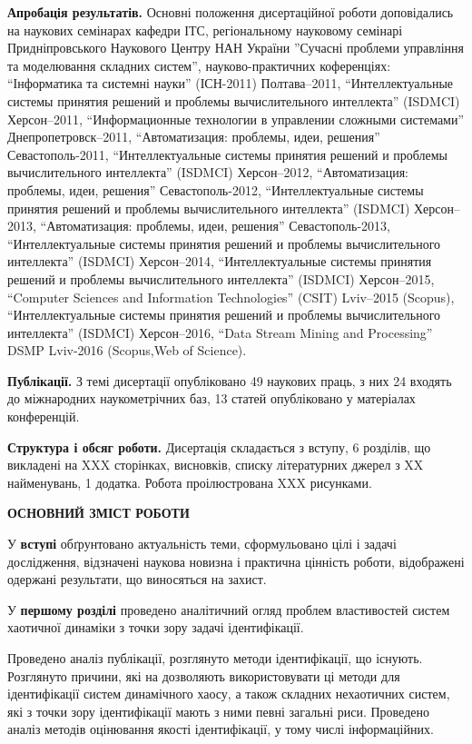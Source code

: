 \documentclass[a4paper,13pt]{atuaref}
\newcommand{\xsect}[1]{\medskip\begin{center}\textbf{#1}\end{center}\medskip\penalty10000}
\begin{document}
\smallskip
\textbf{Апробація результатів.}
Основні положення дисертаційної роботи доповідались на наукових
семінарах кафедри ІТС,
регіональному науковому семінарі Придніпровського Наукового Центру НАН України
''Сучасні проблеми управління та моделювання складних систем'',
науково-практичних коференціях:
``Інформатика та системні науки'' (ІСН-2011) Полтава--2011,
``Интеллектуальные системы принятия решений и проблемы вычислительного интеллекта'' (ISDMCI) Херсон--2011,
``Информационные технологии в управлении сложными системами'' Днепропетровск--2011,
``Автоматизация: проблемы, идеи, решения'' Севастополь-2011,
``Интеллектуальные системы принятия решений и проблемы вычислительного интеллекта'' (ISDMCI) Херсон--2012,
``Автоматизация: проблемы, идеи, решения'' Севастополь-2012,
``Интеллектуальные системы принятия решений и проблемы вычислительного интеллекта'' (ISDMCI) Херсон--2013,
``Автоматизация: проблемы, идеи, решения'' Севастополь-2013,
``Интеллектуальные системы принятия решений и проблемы вычислительного интеллекта'' (ISDMCI) Херсон--2014,
``Интеллектуальные системы принятия решений и проблемы вычислительного интеллекта'' (ISDMCI) Херсон--2015,
``Computer Sciences and Information Technologies'' (CSIT) Lviv--2015 (Scopus),
``Интеллектуальные системы принятия решений и проблемы вычислительного интеллекта'' (ISDMCI) Херсон--2016,
``Data Stream Mining and Processing'' DSMP Lviv-2016 (Scopus,Web of Science).

\smallskip
\textbf{Публікації.}
З темі дисертації опубліковано
49 наукових праць,
з них
24 входять до міжнародних наукометрічних баз,
13 статей опубліковано у матеріалах конференцій.

\smallskip
\textbf{Структура і обсяг роботи.}
Дисертація складається з вступу, 6 розділів, що викладені на
XXX сторінках, висновків, списку літературних джерел з
XX найменувань,
1 додатка.
Робота проілюстрована XXX рисунками.


\xsect{ОСНОВНИЙ ЗМІСТ РОБОТИ}

У \textbf{вступі} обґрунтовано актуальність теми,
сформульовано цілі і задачі дослідження,
відзначені наукова новизна і практична цінність роботи, відображені
одержані результати, що виносяться на захист.

У \textbf{першому розділі}
проведено аналітичний огляд проблем
властивостей систем хаотичної динаміки
з точки зору задачі ідентифікації.

Проведено аналіз публікації, розглянуто методи ідентифікації, що існують.
Розглянуто причини, які на дозволяють використовувати ці методи для
ідентифікації систем динамічного хаосу, а також складних нехаотичних систем, які
з точки зору ідентифікації мають з ними певні загальні риси.  Проведено аналіз
методів оцінювання якості ідентифікації, у тому числі інформаційних.
\end{document}
